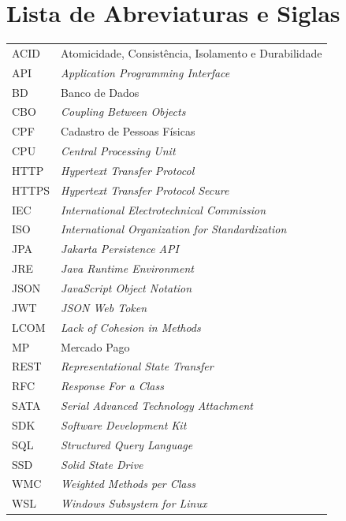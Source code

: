 \chapter*{Lista de Abreviaturas e Siglas}

\begin{tabular}{p{3cm}l}
ACID  & Atomicidade, Consistência, Isolamento e Durabilidade \\
API   & \textit{Application Programming Interface} \\
BD    & Banco de Dados \\
CBO   & \textit{Coupling Between Objects} \\
CPF   & Cadastro de Pessoas Físicas \\
CPU   & \textit{Central Processing Unit} \\
HTTP  & \textit{Hypertext Transfer Protocol} \\
HTTPS & \textit{Hypertext Transfer Protocol Secure} \\
IEC   & \textit{International Electrotechnical Commission} \\
ISO   & \textit{International Organization for Standardization} \\
JPA   & \textit{Jakarta Persistence API} \\
JRE   & \textit{Java Runtime Environment} \\
JSON  & \textit{JavaScript Object Notation} \\
JWT   & \textit{JSON Web Token} \\
LCOM  & \textit{Lack of Cohesion in Methods} \\
MP    & Mercado Pago \\
REST  & \textit{Representational State Transfer} \\
RFC   & \textit{Response For a Class} \\
SATA  & \textit{Serial Advanced Technology Attachment} \\
SDK   & \textit{Software Development Kit} \\
SQL   & \textit{Structured Query Language} \\
SSD   & \textit{Solid State Drive} \\
WMC   & \textit{Weighted Methods per Class} \\
WSL   & \textit{Windows Subsystem for Linux} \\
\end{tabular}
